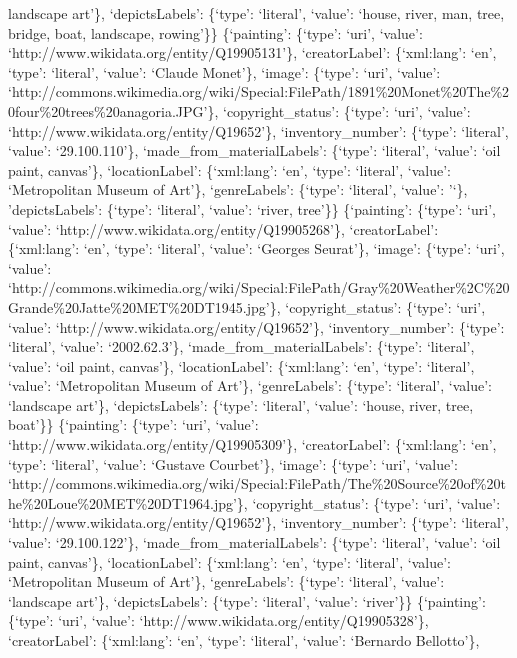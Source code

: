 \documentclass[
  letterpaper,
  DIV=11,
  numbers=noendperiod]{scrreprt}
\begin{document}
landscape art'\}, `depictsLabels': \{`type': `literal', `value': `house,
river, man, tree, bridge, boat, landscape, rowing'\}\} \{`painting':
\{`type': `uri', `value': `http://www.wikidata.org/entity/Q19905131'\},
`creatorLabel': \{`xml:lang': `en', `type': `literal', `value': `Claude
Monet'\}, `image': \{`type': `uri', `value':
`http://commons.wikimedia.org/wiki/Special:FilePath/1891\%20Monet\%20The\%20four\%20trees\%20anagoria.JPG'\},
`copyright\_status': \{`type': `uri', `value':
`http://www.wikidata.org/entity/Q19652'\}, `inventory\_number':
\{`type': `literal', `value': `29.100.110'\},
`made\_from\_materialLabels': \{`type': `literal', `value': `oil paint,
canvas'\}, `locationLabel': \{`xml:lang': `en', `type': `literal',
`value': `Metropolitan Museum of Art'\}, `genreLabels': \{`type':
`literal', `value': '`\}, 'depictsLabels': \{`type': `literal', `value':
`river, tree'\}\} \{`painting': \{`type': `uri', `value':
`http://www.wikidata.org/entity/Q19905268'\}, `creatorLabel':
\{`xml:lang': `en', `type': `literal', `value': `Georges Seurat'\},
`image': \{`type': `uri', `value':
`http://commons.wikimedia.org/wiki/Special:FilePath/Gray\%20Weather\%2C\%20Grande\%20Jatte\%20MET\%20DT1945.jpg'\},
`copyright\_status': \{`type': `uri', `value':
`http://www.wikidata.org/entity/Q19652'\}, `inventory\_number':
\{`type': `literal', `value': `2002.62.3'\},
`made\_from\_materialLabels': \{`type': `literal', `value': `oil paint,
canvas'\}, `locationLabel': \{`xml:lang': `en', `type': `literal',
`value': `Metropolitan Museum of Art'\}, `genreLabels': \{`type':
`literal', `value': `landscape art'\}, `depictsLabels': \{`type':
`literal', `value': `house, river, tree, boat'\}\} \{`painting':
\{`type': `uri', `value': `http://www.wikidata.org/entity/Q19905309'\},
`creatorLabel': \{`xml:lang': `en', `type': `literal', `value': `Gustave
Courbet'\}, `image': \{`type': `uri', `value':
`http://commons.wikimedia.org/wiki/Special:FilePath/The\%20Source\%20of\%20the\%20Loue\%20MET\%20DT1964.jpg'\},
`copyright\_status': \{`type': `uri', `value':
`http://www.wikidata.org/entity/Q19652'\}, `inventory\_number':
\{`type': `literal', `value': `29.100.122'\},
`made\_from\_materialLabels': \{`type': `literal', `value': `oil paint,
canvas'\}, `locationLabel': \{`xml:lang': `en', `type': `literal',
`value': `Metropolitan Museum of Art'\}, `genreLabels': \{`type':
`literal', `value': `landscape art'\}, `depictsLabels': \{`type':
`literal', `value': `river'\}\} \{`painting': \{`type': `uri', `value':
`http://www.wikidata.org/entity/Q19905328'\}, `creatorLabel':
\{`xml:lang': `en', `type': `literal', `value': `Bernardo Bellotto'\},
\end{document}
